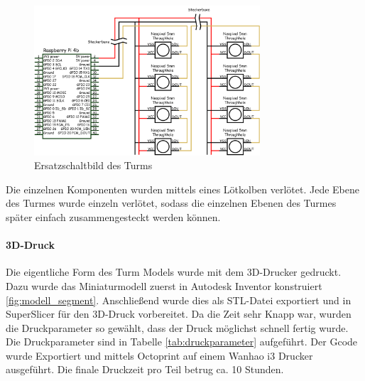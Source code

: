 \begin{figure}[H]
  \centering
  \includegraphics[width=0.75\textwidth]{images/tower_controller_v4_circuit_diagram.png}
  \caption{Ersatzschaltbild des Turms}
  \label{fig:ersatzschaltbild}
\end{figure}

Die einzelnen Komponenten wurden mittels eines Lötkolben verlötet. Jede Ebene des Turmes wurde einzeln verlötet, sodass die einzelnen Ebenen des Turmes später einfach zusammengesteckt werden können.

\paragraph{3D-Druck}

Die eigentliche Form des Turm Models wurde mit dem 3D-Drucker gedruckt. Dazu wurde das Miniaturmodell zuerst in Autodesk Inventor konstruiert \ref{fig:modell_segment}. Anschließend wurde dies als STL-Datei exportiert und in SuperSlicer für den 3D-Druck vorbereitet. Da die Zeit sehr Knapp war, wurden die Druckparameter so gewählt, dass der Druck möglichst schnell fertig wurde. Die Druckparameter sind in Tabelle \ref{tab:druckparameter} aufgeführt. Der Gcode wurde Exportiert und mittels Octoprint auf einem Wanhao i3 Drucker ausgeführt. Die finale Druckzeit pro Teil betrug ca. 10 Stunden.